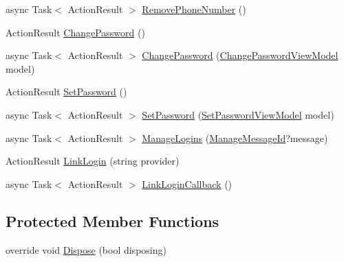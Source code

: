 \begin{DoxyCompactItemize}
\item 
async Task$<$ Action\+Result $>$ \hyperlink{class_bibabook_1_1_controllers_1_1_manage_controller_aef2fc431ab285e63fd6de8c2a2eb90fe}{Remove\+Phone\+Number} ()
\item 
Action\+Result \hyperlink{class_bibabook_1_1_controllers_1_1_manage_controller_ae6bf412bf1512c116540f90c574ca375}{Change\+Password} ()
\item 
async Task$<$ Action\+Result $>$ \hyperlink{class_bibabook_1_1_controllers_1_1_manage_controller_a30f5a9ce5f18dec8cd055e9781f126d1}{Change\+Password} (\hyperlink{class_bibabook_1_1_models_1_1_change_password_view_model}{Change\+Password\+View\+Model} model)
\item 
Action\+Result \hyperlink{class_bibabook_1_1_controllers_1_1_manage_controller_a535915a6f304f78133ea210aadba3880}{Set\+Password} ()
\item 
async Task$<$ Action\+Result $>$ \hyperlink{class_bibabook_1_1_controllers_1_1_manage_controller_a4d619280a5747095a7120e13ae688893}{Set\+Password} (\hyperlink{class_bibabook_1_1_models_1_1_set_password_view_model}{Set\+Password\+View\+Model} model)
\item 
async Task$<$ Action\+Result $>$ \hyperlink{class_bibabook_1_1_controllers_1_1_manage_controller_a31b09e10e35c68702bd01820f5cb9858}{Manage\+Logins} (\hyperlink{class_bibabook_1_1_controllers_1_1_manage_controller_a11520cf302554950f1aeac2bd8137403}{Manage\+Message\+Id}?message)
\item 
Action\+Result \hyperlink{class_bibabook_1_1_controllers_1_1_manage_controller_a9e81bd294a460916f8f00d17e9ffd4d3}{Link\+Login} (string provider)
\item 
async Task$<$ Action\+Result $>$ \hyperlink{class_bibabook_1_1_controllers_1_1_manage_controller_a07c2d39dd76836d870b87d8c0eb3803a}{Link\+Login\+Callback} ()
\end{DoxyCompactItemize}
\subsection*{Protected Member Functions}
\begin{DoxyCompactItemize}
\item 
override void \hyperlink{class_bibabook_1_1_controllers_1_1_manage_controller_a62308464afbd8fa7ee86851f65791ba8}{Dispose} (bool disposing)
\end{DoxyCompactItemize}
